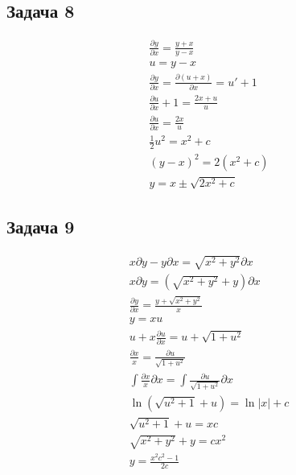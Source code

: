 \subsection*{Задача 8}
\begin{gather*}
	\frac{\partial y}{\partial x} = \frac{y+x}{y-x}\\
	u = y - x\\
	\frac{\partial y}{\partial x} = \frac{\partial (u + x)}{\partial x} = u' + 1\\
	\frac{\partial u}{\partial x} + 1 = \frac{2x + u}{u}\\
	\frac{\partial u}{\partial x} = \frac{2x}{u}\\
	\frac{1}{2}u^2 = x^2 + c\\
	(y - x)^2 = 2(x^2 + c)\\
	y = x \pm \sqrt{2x^2 + c}
\end{gather*}

\subsection*{Задача 9}
\begin{gather*}
	x \partial y - y \partial x = \sqrt{x^2+y^2} \partial x\\
	x \partial y = (\sqrt{x^2+y^2} + y) \partial x\\
	\frac{\partial y}{\partial x} = \frac{y + \sqrt{x^2+y^2}}{x}\\
	y = x u\\
	u + x \frac{\partial u}{\partial x} = u + \sqrt{1 + u^2}\\
	\frac{\partial x}{x} = \frac{\partial u}{\sqrt{1 + u^2}}\\
	\int \frac{\partial x}{x} \partial x = \int \frac{\partial u}{\sqrt{1 + u^2}} \partial x\\
	\ln (\sqrt{u^2 + 1} + u) = \ln|x| + c\\
	\sqrt{u^2 + 1} + u = xc\\
	\sqrt{x^2 + y^2} + y = cx^2\\
	y = \frac{x^2c^2 - 1}{2c}
\end{gather*}

